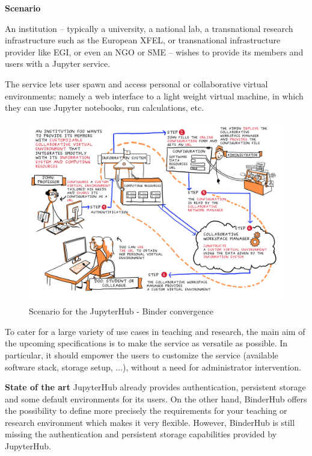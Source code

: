 \begin{task}[
  title=JupyterHub / BinderHub convergence,
  id=jh-bh-conv,
  lead=EP,
  PM=16, %
  wphases={0-36!.5},
  partners={WTT}]

  \textbf{Scenario}

  An institution -- typically a university, a national lab, a transnational
  research infrastructure such as the European XFEL, or transnational
  infrastructure provider like EGI, or even an NGO or SME -- wishes to provide its members and
  users with a Jupyter service.

  The service lets user spawn and access personal or collaborative virtual
  environments: namely a web interface to a light weight virtual machine,
  in which they can use Jupyter notebooks, run calculations, etc.

  \begin{figure}
    \begin{center}
      \includegraphics[width=.75\textwidth]{images/jupyterhub-binder-convergence.png}
    \end{center}
    \caption{Scenario for the JupyterHub - Binder convergence}
    \label{fig:jupyterhub-binder}
  \end{figure}

  To cater for a large variety of use cases in teaching and research,
  the main aim of the upcoming specifications is to make the service as
  versatile as possible. In particular, it should empower the users to 
  customize the service (available software stack, storage setup, ...),
  without a need for administrator intervention.

  \textbf{State of the art}
  JupyterHub already provides authentication, persistent storage and some
  default environments for its users. On the other hand, BinderHub offers
  the possibility to define more precisely the requirements for your teaching
  or research environment which makes it very flexible. However, BinderHub is still missing the  
  authentication and persistent storage capabilities provided by JupyterHub.


\end{task}
